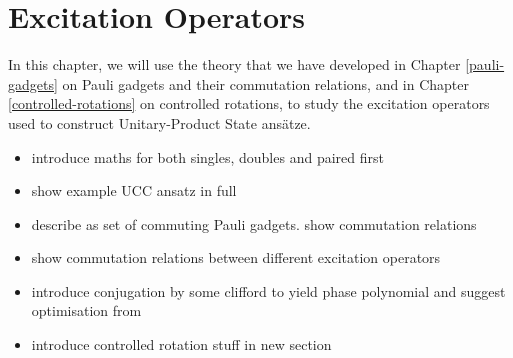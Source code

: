 \chapter{Excitation Operators}%
\label{excitation-operators}

In this chapter, we will use the theory that we have developed in Chapter \ref{pauli-gadgets} on Pauli gadgets and their commutation relations, and in Chapter \ref{controlled-rotations} on controlled rotations, to study the excitation operators used to construct Unitary-Product State ansätze.


\begin{itemize}[itemsep=-5pt]
    \item introduce maths for both singles, doubles and paired first
    \item show example UCC ansatz in full
    \item describe as set of commuting Pauli gadgets. show commutation relations
    \item show commutation relations between different excitation operators
    \item introduce conjugation by some clifford to yield phase polynomial and suggest optimisation from \cite{Cowtan2020}
    \item introduce controlled rotation stuff in new section
\end{itemize}

